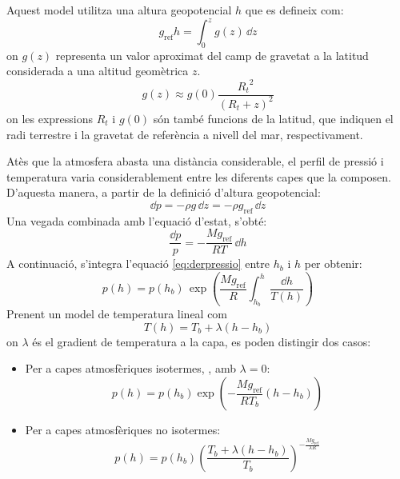 Aquest model utilitza una altura geopotencial $h$ que es defineix com:
\begin{equation}
    g_\mathrm{ref} h = \int_{0}^{z} g(z) \, \dd z 
\end{equation}
on $g(z)$ representa un valor aproximat del camp de gravetat a la latitud considerada a una altitud geomètrica $z$.
\begin{equation}
    g(z) \approx g(0) \frac{{R_t}^2}{(R_t+z)^2}
\end{equation}
on les expressions $R_t$ i $g(0)$ són també funcions de la latitud, que indiquen el radi terrestre i la gravetat de referència a nivell del mar, respectivament.

Atès que la atmosfera abasta una distància considerable, el perfil de pressió i temperatura varia considerablement entre les diferents capes que la composen. D'aquesta manera, a partir de la definició d'altura geopotencial:
\begin{equation}
    \dd p = -\rho g \, \dd z = -\rho g_\mathrm{ref} \, \dd z
\end{equation}
Una vegada combinada amb l'equació d'estat, s'obté:
\begin{equation} \label{eq:derpressio}
    \frac{\dd p}{p} = -\frac{M g_\mathrm{ref}}{R T} \, \dd h
\end{equation}
A continuació, s'integra l'equació \eqref{eq:derpressio} entre $h_b$ i $h$ per obtenir:
\begin{equation}
    p \left( h \right) = 
    p \left( h_b \right) \, 
    \exp{\left( \frac{M g_\mathrm{ref}}{R} \int_{h_b}^h \frac{\dd \mathit{h}}{T \left( \mathit{h} \right)} \right)}
\end{equation}
Prenent un model de temperatura lineal com
\begin{equation}
    T(h) = T_b + \lambda (h - h_b)
\end{equation}
on $\lambda$ és el gradient de temperatura a la capa, es poden distingir dos casos:
\begin{itemize}
    \item Per a capes atmosfèriques isotermes, \ie, amb $\lambda = 0$:
    \begin{equation}
        p(h) = 
        p \left( h _b \right) \exp{\left( - \frac{M g_\mathrm{ref}}{R T_b} \left( h - h_b \right) \right)}
    \end{equation}
    \item Per a capes atmosfèriques no isotermes:
    \begin{equation}
        p(h) = 
        p \left( h_b \right) 
        {\left( \frac{T_b + \lambda \left( h - h_b \right)}{T_b} \right)}^{-\frac{M g_\mathrm{ref}}{\lambda R}}
    \end{equation}
    \end{itemize}
